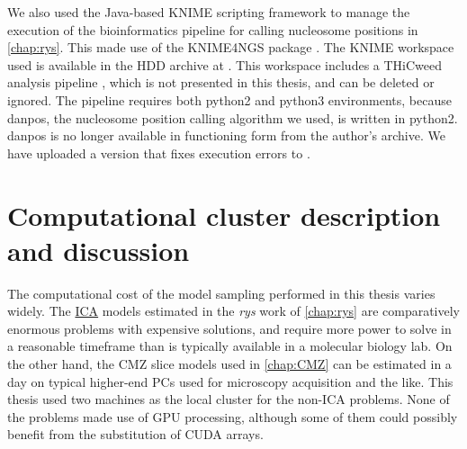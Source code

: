 \documentclass{ut-thesis}
\begin{document}
\begin{NoHyper}
We also used the Java-based KNIME scripting framework to manage the execution of the bioinformatics pipeline for calling nucleosome positions in \autoref{chap:rys}. This made use of the KNIME4NGS package \cite{Hastreiter2017}. The KNIME workspace used is available in the HDD archive at . This workspace includes a THiCweed analysis pipeline \cite{Agrawal2017}, which is not presented in this thesis, and can be deleted or ignored. The pipeline requires both python2 and python3 environments, because danpos, the nucleosome position calling algorithm we used, is written in python2. danpos \cite{Chen2013} is no longer available in functioning form from the author's archive. We have uploaded a version that fixes execution errors to .

\section{Computational cluster description and discussion}
\label{sec:cluster}
The computational cost of the model sampling performed in this thesis varies widely. The \hyperref[ssec:ICA]{ICA} models estimated in the \textit{rys} work of \autoref{chap:rys} are comparatively enormous problems with expensive solutions, and require more power to solve in a reasonable timeframe than is typically available in a molecular biology lab. On the other hand, the CMZ slice models used in \autoref{chap:CMZ} can be estimated in a day on typical higher-end PCs used for microscopy acquisition and the like. This thesis used two machines as the local cluster for the non-ICA problems. None of the problems made use of GPU processing, although some of them could possibly benefit from the substitution of CUDA arrays.


\end{NoHyper}
\end{document}
